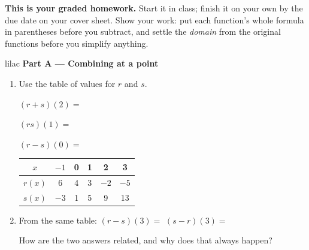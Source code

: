 \documentclass[10pt]{article}
\begin{document}

\vspace{0.1in}

\boxguard[8]
\begin{remindbox}
\small
\textbf{This is your graded homework.} Start it in class; finish it on your own by the due date
on your cover sheet. Show your work: put each function's whole formula in parentheses before you
subtract, and settle the \emph{domain} from the original functions before you simplify anything.
\end{remindbox}

\vspace{0.1in}

\begin{headlinebox}{lilac}
\textbf{\color{plum}Part A --- Combining at a point}
\end{headlinebox}

\begin{enumerate}[leftmargin=1.9em, itemsep=8pt]

\item \begin{minipage}[t]{0.48\linewidth}
      \vspace{0pt}
      Use the table of values for $r$ and $s$.

      \smallskip
      $(r+s)(2) = $ 

      \smallskip
      $(rs)(1) = $ 

      \smallskip
      $(r-s)(0) = $ 
      \end{minipage}\hfill
      \begin{minipage}[t]{0.46\linewidth}
      \vspace{0pt}
      \centering
      {\renewcommand{\arraystretch}{1.3}
      \begin{tabular}{|c|c|c|c|c|c|}
      \hline
      $x$    & $-1$ & 0 & 1 & 2 & 3 \\ \hline
      $r(x)$ & 6    & 4 & 3 & $-2$ & $-5$ \\ \hline
      $s(x)$ & $-3$ & 1 & 5 & 9 & 13 \\ \hline
      \end{tabular}}
      \end{minipage}

\item From the same table: \quad $(r-s)(3) = $  \qquad $(s-r)(3) = $ 

      How are the two answers related, and why does that always happen?

\end{enumerate}
\end{document}
